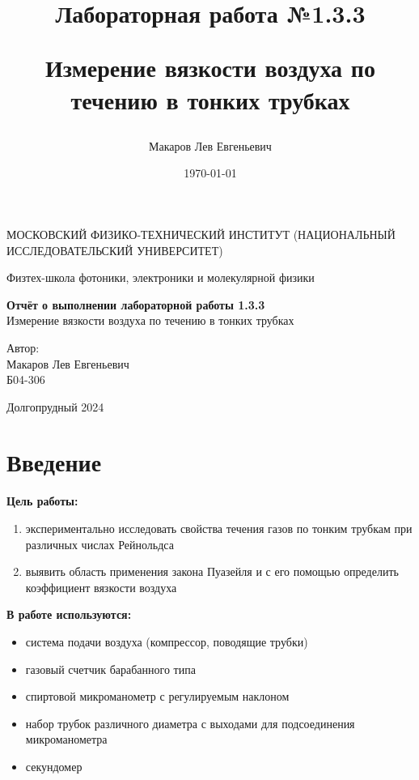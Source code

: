 \documentclass[a4paper,12pt]{article}
\author{Макаров Лев Евгеньевич}
\title{Лабораторная работа №1.3.3

Измерение вязкости воздуха по течению в тонких трубках
}
\date{\today}
\begin{document}
\begin{titlepage}
	\begin{center}
		{\large МОСКОВСКИЙ ФИЗИКО-ТЕХНИЧЕСКИЙ ИНСТИТУТ (НАЦИОНАЛЬНЫЙ ИССЛЕДОВАТЕЛЬСКИЙ УНИВЕРСИТЕТ)}
	\end{center}
	\begin{center}
		{\large Физтех-школа фотоники, электроники и молекулярной физики}
	\end{center}
	
	
	\vspace{4.5cm}
	{\huge
		\begin{center}
			{\bf Отчёт о выполнении лабораторной работы 1.3.3}\\
			Измерение вязкости воздуха по течению в тонких трубках
		\end{center}
	}
	\vspace{2cm}
	\begin{flushright}
		{\LARGE Автор:\\ Макаров Лев Евгеньевич \\
			\vspace{0.2cm}
			Б04-306}
	\end{flushright}
	\vspace{8cm}
	\begin{center}
		Долгопрудный 2024
	\end{center}
\end{titlepage}

\section{Введение}

\textbf{Цель работы:} 
\begin{enumerate}
	\item экспериментально исследовать свойства течения газов по тонким трубкам при различных числах Рейнольдса
    \item выявить область применения закона Пуазейля и с его помощью определить коэффициент вязкости воздуха
\end{enumerate}

\textbf{В работе используются:} 
\begin{itemize}
    \item система подачи воздуха (компрессор, поводящие трубки)
    \item газовый счетчик барабанного типа
    \item спиртовой микроманометр с регулируемым наклоном
    \item набор трубок различного диаметра с выходами для подсоединения микроманометра
    \item секундомер
\end{itemize}
\medskip
\end{document}
